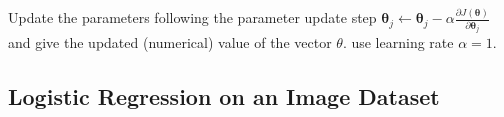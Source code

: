 \documentclass[11pt,addpoints,answers]{exam}
\newcommand{\thetav     }{\boldsymbol \theta     }
\begin{document}
\begin{questions}
    \begin{your_solution}[title=Work,height=18cm,width=15.3cm]
    \end{your_solution}

    
    \clearpage
    
    \question[1] Update the parameters following the parameter update step $\thetav_j \leftarrow \thetav_j - \alpha \frac{\partial J(\thetav)}{\partial \thetav_j}$ and give the updated (numerical) value of the vector $\theta$. use learning rate $\alpha = 1$.

    \begin{your_solution}[title=$\theta_1$,height=1.8cm,width=3cm]
    \end{your_solution}
    \begin{your_solution}[title=$\theta_2$,height=1.8cm,width=3cm]
    \end{your_solution}
    \begin{your_solution}[title=$\theta_3$,height=1.8cm,width=3cm]
    \end{your_solution}
    \begin{your_solution}[title=$\theta_4$,height=1.8cm,width=3cm]
    \end{your_solution}
    \begin{your_solution}[title=$\theta_5$,height=1.8cm,width=3cm]
    \end{your_solution}
    
    \begin{your_solution}[title=Work, height=6cm,width=15.3cm]
    \end{your_solution}
    
    \clearpage
    
    


 \clearpage
 
 \end{questions}
 
 \subsection{Logistic Regression on an Image Dataset}
\label{sec:images}
\end{document}
